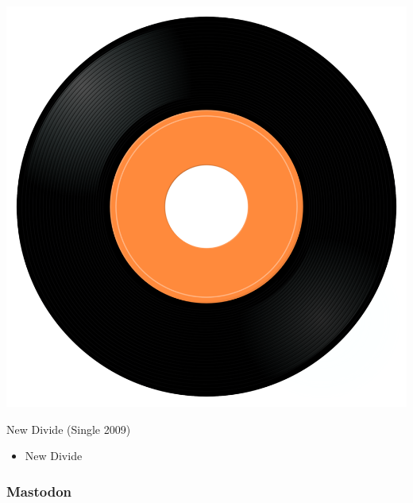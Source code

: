 \begin{minipage}[t]{0.25\textwidth}
\captionsetup{type=figure}
\includegraphics[width=\textwidth]{Images/cover.png}
\caption*{New Divide (Single 2009)}
\end{minipage}
\begin{minipage}[t]{0.25\textwidth}\vspace{0pt}
\begin{itemize}[nosep,leftmargin=1em,labelwidth=*,align=left]
	\setlength{\itemsep}{0pt}
	\item New Divide
\end{itemize}
\end{minipage}

\subsubsection{Mastodon}


